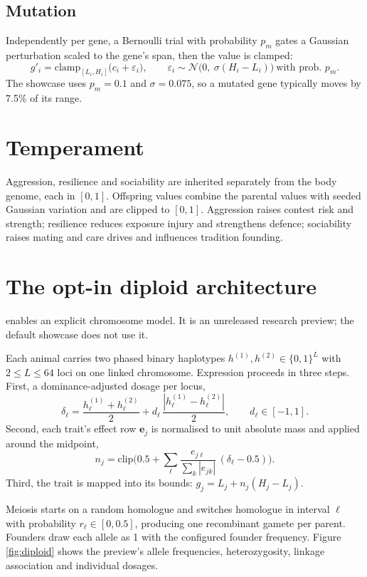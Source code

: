 \subsection{Mutation}
Independently per gene, a Bernoulli trial with probability $p_m$ gates a Gaussian
perturbation scaled to the gene's span, then the value is clamped:
\[
g'_i=\mathrm{clamp}_{[L_i,H_i]}\big(c_i+\varepsilon_i\big),\qquad
\varepsilon_i\sim\mathcal{N}\big(0,\ \sigma(H_i-L_i)\big)\ \text{with prob. } p_m.
\]
The showcase uses $p_m=0.1$ and $\sigma=0.075$, so a mutated gene typically moves
by 7.5\% of its range.

\section{Temperament}
Aggression, resilience and sociability are inherited separately from the body
genome, each in $[0,1]$. Offspring values combine the parental values with seeded
Gaussian variation and are clipped to $[0,1]$. Aggression raises contest risk and
strength; resilience reduces exposure injury and strengthens defence; sociability
raises mating and care drives and influences tradition founding.

\section{The opt-in diploid architecture}
 enables an explicit chromosome model. It is an
unreleased research preview; the default showcase does not use it.

Each animal carries two phased binary haplotypes $h^{(1)},h^{(2)}\in\{0,1\}^L$
with $2\le L\le64$ loci on one linked chromosome. Expression proceeds in three
steps. First, a dominance-adjusted dosage per locus,
\[
\delta_\ell=\frac{h^{(1)}_\ell+h^{(2)}_\ell}{2}+d_\ell\,\frac{|h^{(1)}_\ell-h^{(2)}_\ell|}{2},
\qquad d_\ell\in[-1,1].
\]
Second, each trait's effect row $\mathbf{e}_j$ is normalised to unit absolute mass
and applied around the midpoint,
\[
n_j=\mathrm{clip}\Big(0.5+\sum_\ell \frac{e_{j\ell}}{\sum_k|e_{jk}|}\,(\delta_\ell-0.5)\Big).
\]
Third, the trait is mapped into its bounds: $g_j=L_j+n_j(H_j-L_j)$.

Meiosis starts on a random homologue and switches homologue in interval $\ell$
with probability $r_\ell\in[0,0.5]$, producing one recombinant gamete per parent.
Founders draw each allele as 1 with the configured founder frequency. Figure
\ref{fig:diploid} shows the preview's allele frequencies, heterozygosity, linkage
association and individual dosages.

